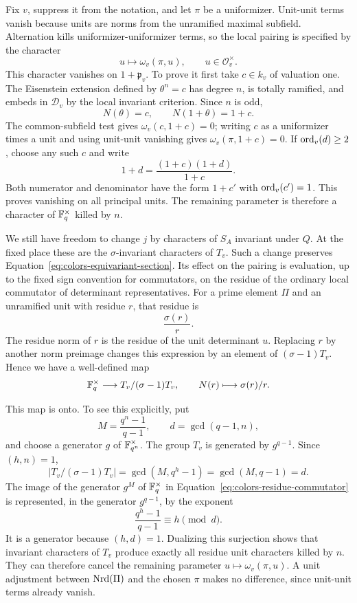 Fix $v$, suppress it from the notation, and let $\pi$ be a uniformizer.
Unit-unit terms vanish because units are norms from the unramified
maximal subfield.  Alternation kills uniformizer-uniformizer terms, so
the local pairing is specified by the character
\[
 u\longmapsto\omega_v(\pi,u),\qquad u\in\mathcal O_v^\times.
\]
This character vanishes on $1+\mathfrak p_v$.  To prove it first take
$c\in k_v$ of valuation one.  The Eisenstein extension defined by
$\theta^n=c$ has degree $n$, is totally ramified, and embeds in
$\mathcal D_v$ by the local invariant criterion.  Since $n$ is odd,
\[
 N(\theta)=c,\qquad N(1+\theta)=1+c.
\]
The common-subfield test gives $\omega_v(c,1+c)=0$; writing $c$ as a
uniformizer times a unit and using unit-unit vanishing gives
$\omega_v(\pi,1+c)=0$.  If $\operatorname{ord}_v(d)\geq2$, choose any such $c$ and
write
\[
 1+d=\frac{(1+c)(1+d)}{1+c}.
\]
Both numerator and denominator have the form $1+c'$ with
$\operatorname{ord}_v(c')=1$.  This proves vanishing on all principal units.
The remaining parameter is therefore a character of
$\mathbb F_q^\times$ killed by $n$.

We still have freedom to change $j$ by characters of $S_A$ invariant
under $Q$.  At the fixed place these are the $\sigma$-invariant
characters of $T_v$.  Such a change preserves
Equation~\eqref{eq:colors-equivariant-section}.  Its effect on the
pairing is evaluation, up to the fixed sign convention for commutators,
on the residue of the ordinary local commutator of determinant
representatives.  For a prime element $\Pi$ and an unramified unit with
residue $r$, that residue is
\[
 \frac{\sigma(r)}{r}.
\]
The residue norm of $r$ is the residue of the unit determinant $u$.
Replacing $r$ by another norm preimage changes this expression by an
element of $(\sigma-1)T_v$.  Hence we have a well-defined map
\begin{equation}\label{eq:colors-residue-commutator}
 \mathbb F_q^\times\longrightarrow T_v/(\sigma-1)T_v,
 \qquad N(r)\longmapsto\sigma(r)/r.
\end{equation}

This map is onto.  To see this explicitly, put
\[
 M=\frac{q^n-1}{q-1},\qquad d=\gcd(q-1,n),
\]
and choose a generator $g$ of $\mathbb F_{q^n}^\times$.  The group $T_v$ is
generated by $g^{q-1}$.  Since $(h,n)=1$,
\[
 |T_v/(\sigma-1)T_v|
 =\gcd(M,q^h-1)=\gcd(M,q-1)=d.
\]
The image of the generator $g^M$ of $\mathbb F_q^\times$ in
Equation~\eqref{eq:colors-residue-commutator} is represented, in the
generator $g^{q-1}$, by the exponent
\[
 \frac{q^h-1}{q-1}\equiv h\pmod d.
\]
It is a generator because $(h,d)=1$.  Dualizing this surjection shows
that invariant characters of $T_v$ produce exactly all residue unit
characters killed by $n$.  They can therefore cancel the remaining
parameter $u\mapsto\omega_v(\pi,u)$.  A unit adjustment between
$\operatorname{Nrd}(\Pi)$ and the chosen $\pi$ makes no difference, since unit-unit
terms already vanish.

